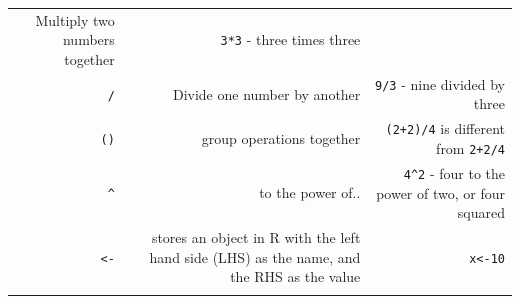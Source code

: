 \documentclass[]{book}
\begin{document}
\begin{longtable}[]{@{}rrr@{}}
\begin{minipage}[t]{0.30\columnwidth}
Multiply two numbers together\strut
\end{minipage} & \begin{minipage}[t]{0.30\columnwidth}\raggedleft
\texttt{3*3} - three times three\strut
\end{minipage}\tabularnewline
\begin{minipage}[t]{0.30\columnwidth}\raggedleft
\texttt{/}\strut
\end{minipage} & \begin{minipage}[t]{0.30\columnwidth}\raggedleft
Divide one number by another\strut
\end{minipage} & \begin{minipage}[t]{0.30\columnwidth}\raggedleft
\texttt{9/3} - nine divided by three\strut
\end{minipage}\tabularnewline
\begin{minipage}[t]{0.30\columnwidth}\raggedleft
\texttt{()}\strut
\end{minipage} & \begin{minipage}[t]{0.30\columnwidth}\raggedleft
group operations together\strut
\end{minipage} & \begin{minipage}[t]{0.30\columnwidth}\raggedleft
\texttt{(2+2)/4} is different from \texttt{2+2/4}\strut
\end{minipage}\tabularnewline
\begin{minipage}[t]{0.30\columnwidth}\raggedleft
\texttt{\^{}}\strut
\end{minipage} & \begin{minipage}[t]{0.30\columnwidth}\raggedleft
to the power of..\strut
\end{minipage} & \begin{minipage}[t]{0.30\columnwidth}\raggedleft
\texttt{4\^{}2} - four to the power of two, or four squared\strut
\end{minipage}\tabularnewline
\begin{minipage}[t]{0.30\columnwidth}\raggedleft
\texttt{\textless{}-}\strut
\end{minipage} & \begin{minipage}[t]{0.30\columnwidth}\raggedleft
stores an object in R with the left hand side (LHS) as the name, and the RHS as the value\strut
\end{minipage} & \begin{minipage}[t]{0.30\columnwidth}\raggedleft
\texttt{x\textless{}-10}\strut
\end{minipage}\tabularnewline
\begin{minipage}[t]{0.30\columnwidth}\raggedleft

\end{minipage}
\end{longtable}
\end{document}
